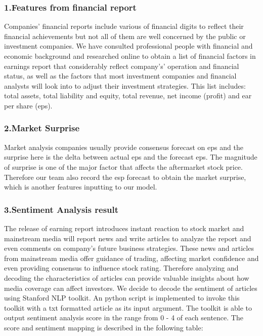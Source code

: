 \documentclass[letterpaper, 10 pt, conference]{ieeeconf}  %
\begin{document}
\subsubsection*{1.Features from financial report}
Companies’ financial reports include various of financial digits to reflect their financial achievements but not all of them are well concerned by the public or investment companies. We have consulted professional people with financial and economic background and researched online to obtain a list of financial factors in earnings report that considerably reflect company's’ operation and financial status, as well as the factors that most investment companies and financial analysts will look into to adjust their investment strategies. This list includes: total assets, total liability and equity, total revenue, net income (profit) and ear per share (eps).

\subsubsection*{2.Market Surprise}
Market analysis companies usually provide consensus forecast on eps and the surprise here is the delta between actual eps and the forecast eps. The magnitude of surprise is one of the major factor that affects the aftermarket stock price. Therefore our team also record the esp forecast to obtain the market surprise, which is another features inputting to our model.

\subsubsection*{3.Sentiment Analysis result}
The release of earning report introduces instant reaction to stock market and mainstream media will report news and write articles to analyze the report and even comments on company’s future business strategies. These news and articles from mainstream media offer guidance of trading, affecting market confidence and even providing consensus to influence stock rating. Therefore analyzing and decoding the characteristics of articles can provide valuable insights about how media coverage can affect investors. We decide to decode the sentiment of articles using Stanford NLP toolkit. An python script is implemented to invoke this toolkit with a txt formatted article as its input argument. The toolkit is able to output sentiment analysis score in the range from 0 - 4 of each sentence. The score and sentiment mapping is described in the following table:
\end{document}
